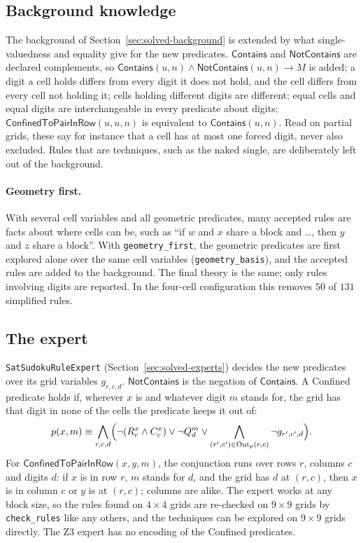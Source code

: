 \documentclass[11pt,a4paper]{article}
\theoremstyle{definition}
\theoremstyle{remark}
\newcommand{\code}[1]{\texttt{#1}}
\newcommand{\pred}[1]{\mathsf{#1}}
\newcommand{\Contains}{\pred{Contains}}
\newcommand{\NotContains}{\pred{NotContains}}
\newcommand{\Bad}{\operatorname{Out}}
\begin{document}
\subsection{Background knowledge}

The background of Section~\ref{sec:solved-background} is extended by what single-valuedness and equality give for the new predicates. $\Contains$ and $\NotContains$ are declared complements, so $\Contains(u, n) \wedge \NotContains(u, n) \to M$ is added; a digit a cell holds differs from every digit it does not hold, and the cell differs from every cell not holding it; cells holding different digits are different; equal cells and equal digits are interchangeable in every predicate about digits; $\pred{ConfinedToPairInRow}(u, u, n)$ is equivalent to $\Contains(u, n)$. Read on partial grids, these say for instance that a cell has at most one forced digit, never also excluded. Rules that are techniques, such as the naked single, are deliberately left out of the background.

\paragraph{Geometry first.}
With several cell variables and all geometric predicates, many accepted rules are facts about where cells can be, such as ``if $w$ and $x$ share a block and \dots, then $y$ and $z$ share a block''. With \code{geometry\_first}, the geometric predicates are first explored alone over the same cell variables (\code{geometry\_basis}), and the accepted rules are added to the background. The final theory is the same; only rules involving digits are reported. In the four-cell configuration this removes $50$ of $131$ simplified rules.

\subsection{The expert}\label{sec:techniques-expert}

\code{SatSudokuRuleExpert} (Section~\ref{sec:solved-experts}) decides the new predicates over its grid variables $g_{r,c,d}$. $\NotContains$ is the negation of $\Contains$. A Confined predicate holds if, wherever $x$ is and whatever digit $m$ stands for, the grid has that digit in none of the cells the predicate keeps it out of:
\[
  p(x, m) \equiv \bigwedge_{r, c, d} \Bigl(\neg(R^x_r \wedge C^x_c) \vee \neg Q^m_d \vee \bigwedge_{(r', c') \in \Bad_p(r, c)} \neg g_{r', c', d}\Bigr).
\]
For $\pred{ConfinedToPairInRow}(x, y, m)$, the conjunction runs over rows $r$, columns $c$ and digits $d$: if $x$ is in row $r$, $m$ stands for $d$, and the grid has $d$ at $(r, c)$, then $x$ is in column $c$ or $y$ is at $(r, c)$; columns are alike. The expert works at any block size, so the rules found on $4 \times 4$ grids are re-checked on $9 \times 9$ grids by \code{check\_rules} like any others, and the techniques can be explored on $9 \times 9$ grids directly. The Z3 expert has no encoding of the Confined predicates.
\end{document}
